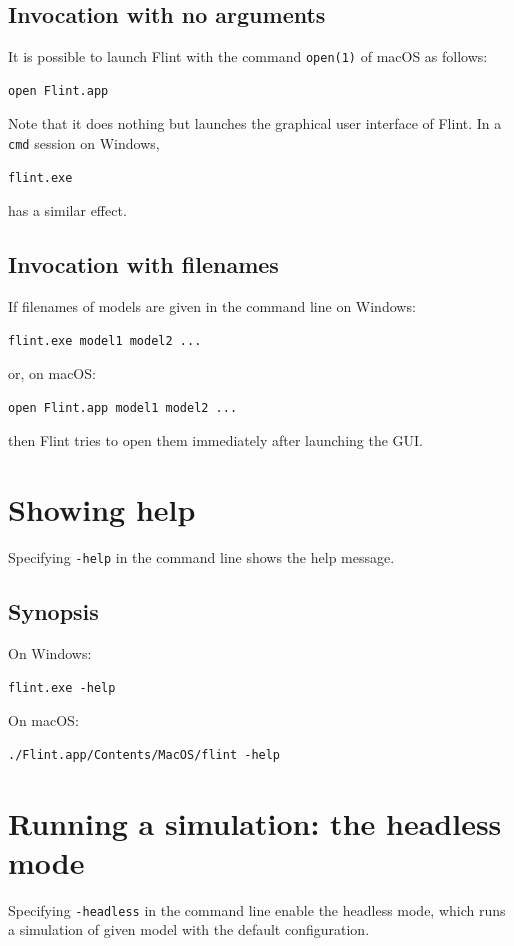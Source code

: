 \documentclass[a4paper,10pt]{report}
\begin{document}
\subsection{Invocation with no arguments}
\label{sec:orgb90196c}
It is possible to launch Flint with the command \texttt{open(1)} of macOS as follows:
\begin{verbatim}
open Flint.app
\end{verbatim}
Note that it does nothing but launches the graphical user interface of Flint.
In a \texttt{cmd} session on Windows,
\begin{verbatim}
flint.exe
\end{verbatim}
has a similar effect.

\subsection{Invocation with filenames}
\label{sec:orgfee9a09}
If filenames of models are given in the command line on Windows:
\begin{verbatim}
flint.exe model1 model2 ...
\end{verbatim}
or, on macOS:
\begin{verbatim}
open Flint.app model1 model2 ...
\end{verbatim}
then Flint tries to open them immediately after launching the GUI.

\section{Showing help}
\label{sec:org13c5d9b}
Specifying \texttt{-help} in the command line shows the help message.

\subsection{Synopsis}
\label{sec:org8306050}
On Windows:
\begin{verbatim}
flint.exe -help
\end{verbatim}
On macOS:
\begin{verbatim}
./Flint.app/Contents/MacOS/flint -help
\end{verbatim}

\section{Running a simulation: the headless mode}
\label{sec:org02b0c95}
Specifying \texttt{-headless} in the command line enable the headless mode, which
runs a simulation of given model with the default configuration.
\end{document}
